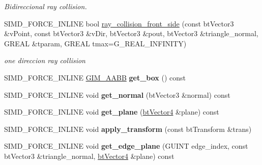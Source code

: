 \begin{DoxyCompactItemize}
\begin{DoxyCompactList}\small\item\em Bidireccional ray collision. \end{DoxyCompactList}\item 
\mbox{\label{classGIM__TRIANGLE_a2b333284fd573994acf89b9085a61927}} 
S\+I\+M\+D\+\_\+\+F\+O\+R\+C\+E\+\_\+\+I\+N\+L\+I\+NE bool \hyperlink{classGIM__TRIANGLE_a2b333284fd573994acf89b9085a61927}{ray\+\_\+collision\+\_\+front\+\_\+side} (const bt\+Vector3 \&v\+Point, const bt\+Vector3 \&v\+Dir, bt\+Vector3 \&pout, bt\+Vector3 \&triangle\+\_\+normal, G\+R\+E\+AL \&tparam, G\+R\+E\+AL tmax=G\+\_\+\+R\+E\+A\+L\+\_\+\+I\+N\+F\+I\+N\+I\+TY)
\begin{DoxyCompactList}\small\item\em one direccion ray collision \end{DoxyCompactList}\item 
\mbox{\label{classGIM__TRIANGLE_acbe4f54e9838827ca7341d4caeb18fcc}} 
S\+I\+M\+D\+\_\+\+F\+O\+R\+C\+E\+\_\+\+I\+N\+L\+I\+NE \hyperlink{classGIM__AABB}{G\+I\+M\+\_\+\+A\+A\+BB} {\bfseries get\+\_\+box} () const
\item 
\mbox{\label{classGIM__TRIANGLE_a72f96413abaeca198cc013800b1b2c7d}} 
S\+I\+M\+D\+\_\+\+F\+O\+R\+C\+E\+\_\+\+I\+N\+L\+I\+NE void {\bfseries get\+\_\+normal} (bt\+Vector3 \&normal) const
\item 
\mbox{\label{classGIM__TRIANGLE_a57e15b754d9a2af873dd0655abe12410}} 
S\+I\+M\+D\+\_\+\+F\+O\+R\+C\+E\+\_\+\+I\+N\+L\+I\+NE void {\bfseries get\+\_\+plane} (\hyperlink{classbtVector4}{bt\+Vector4} \&plane) const
\item 
\mbox{\label{classGIM__TRIANGLE_ab118892e21f9683a91207072ada1d179}} 
S\+I\+M\+D\+\_\+\+F\+O\+R\+C\+E\+\_\+\+I\+N\+L\+I\+NE void {\bfseries apply\+\_\+transform} (const bt\+Transform \&trans)
\item 
\mbox{\label{classGIM__TRIANGLE_a63a2c22d4532c93c5270d7f4216dbf12}} 
S\+I\+M\+D\+\_\+\+F\+O\+R\+C\+E\+\_\+\+I\+N\+L\+I\+NE void {\bfseries get\+\_\+edge\+\_\+plane} (G\+U\+I\+NT edge\+\_\+index, const bt\+Vector3 \&triangle\+\_\+normal, \hyperlink{classbtVector4}{bt\+Vector4} \&plane) const

\end{DoxyCompactItemize}

